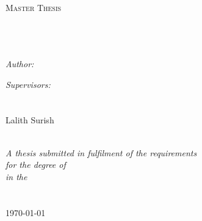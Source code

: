 \documentclass[11pt, a4paper, oneside]{Thesis} %
\begin{document}
\begin{titlepage}
\begin{center}

\textsc{\LARGE \univname}\\[1.5cm] %
\textsc{\Large Master Thesis}\\[0.5cm] %

\HRule \\[0.4cm] %
{\huge \bfseries \ttitle}\\[0.4cm] %
\HRule \\[1.5cm] %
 
\begin{minipage}{0.4\textwidth}
\begin{flushleft} \large
\emph{Author:}\\
{\authornames} %
\end{flushleft}
\end{minipage}
\begin{minipage}{0.3\textwidth}
\begin{flushleft} \large
\emph{Supervisors:} \\
{\supname}\\ %
{\examname}\\
{Lalith Surish} 
 
\end{flushleft}
\end{minipage}\\[3cm]
 
\large \textit{A thesis submitted in fulfilment of the requirements\\ for the degree of \degreename}\\[0.3cm] %
\textit{in the}\\[0.4cm]
\groupname\\\deptname\\[2cm] %
 
{\large \today}\\[4cm] %
 
\vfill
\end{center}

\end{titlepage}

\clearpage %
\end{document}
